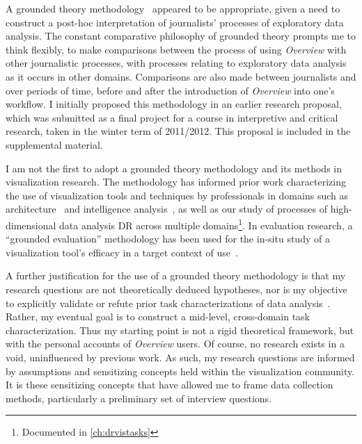 A grounded theory methodology~\cite{Charmaz2006} appeared to be appropriate, given a need to construct a post-hoc interpretation of journalists' processes of exploratory data analysis. 
The constant comparative philosophy of grounded theory prompts me to think flexibly, to make comparisons between the process of using {\it Overview} with other journalistic processes, with processes relating to exploratory data analysis as it occurs in other domains. 
Comparisons are also made between journalists and over periods of time, before and after the introduction of {\it Overview} into one's workflow. 
I initially proposed this methodology in an earlier research proposal, which was submitted as a final project for a course in interpretive and critical research, taken in the winter term of 2011/2012. 
This proposal is included in the supplemental material.

I am not the first to adopt a grounded theory methodology and its methods in visualization research. 
The methodology has informed prior work characterizing the use of visualization tools and techniques by professionals in domains such as architecture~\cite{Tory2008} and intelligence analysis~\cite{Kang2011}, as well as our study of processes of high-dimensional data analysis \ac{DR} across multiple domains\footnote{Documented in \autoref{ch:drvistasks}}. 
In evaluation research, a ``grounded evaluation'' methodology has been used for the in-situ study of a visualization tool's efficacy in a target context of use~\cite{Isenberg2008}.

A further justification for the use of a grounded theory methodology is that my research questions are not theoretically deduced hypotheses, nor is my objective to explicitly validate or refute prior task characterizations of data analysis~\cite{Amar2005,Pirolli2009,Springmeyer1992}. 
Rather, my eventual goal is to construct a mid-level, cross-domain task characterization. 
Thus my starting point is not a rigid theoretical framework, but with the personal accounts of {\it Overview} users.
Of course, no research exists in a void, uninfluenced by previous work. 
As such, my research questions are informed by assumptions and sensitizing concepts held within the visualization community. 
It is these sensitizing concepts that have allowed me to frame data collection methods, particularly a preliminary set of interview questions. 


